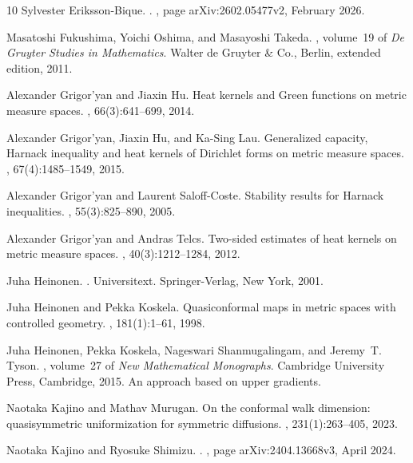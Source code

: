 \documentclass[11pt,a4paper]{article}
\numberwithin{equation}{section}
\theoremstyle{plain}
\theoremstyle{definition}
\begin{document}
\begin{thebibliography}{10}
Sylvester {Eriksson-Bique}.
.
, page arXiv:2602.05477v2, February 2026.

Masatoshi Fukushima, Yoichi Oshima, and Masayoshi Takeda.
, volume~19 of
  {\em De Gruyter Studies in Mathematics}.
\newblock Walter de Gruyter \& Co., Berlin, extended edition, 2011.

Alexander Grigor'yan and Jiaxin Hu.
\newblock Heat kernels and {G}reen functions on metric measure spaces.
, 66(3):641--699, 2014.

Alexander Grigor'yan, Jiaxin Hu, and Ka-Sing Lau.
\newblock Generalized capacity, {H}arnack inequality and heat kernels of
  {D}irichlet forms on metric measure spaces.
, 67(4):1485--1549, 2015.

Alexander Grigor'yan and Laurent Saloff-Coste.
\newblock Stability results for {H}arnack inequalities.
, 55(3):825--890, 2005.

Alexander Grigor'yan and Andras Telcs.
\newblock Two-sided estimates of heat kernels on metric measure spaces.
, 40(3):1212--1284, 2012.

Juha Heinonen.
.
\newblock Universitext. Springer-Verlag, New York, 2001.

Juha Heinonen and Pekka Koskela.
\newblock Quasiconformal maps in metric spaces with controlled geometry.
, 181(1):1--61, 1998.

Juha Heinonen, Pekka Koskela, Nageswari Shanmugalingam, and Jeremy~T. Tyson.
, volume~27 of {\em New
  Mathematical Monographs}.
\newblock Cambridge University Press, Cambridge, 2015.
\newblock An approach based on upper gradients.

Naotaka Kajino and Mathav Murugan.
\newblock On the conformal walk dimension: quasisymmetric uniformization for
  symmetric diffusions.
, 231(1):263--405, 2023.

Naotaka {Kajino} and Ryosuke {Shimizu}.
.
, page arXiv:2404.13668v3, April 2024.


\end{thebibliography}
\end{document}
